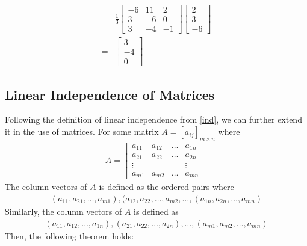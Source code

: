 \documentclass[a4paper]{article}
\theoremstyle{plain}
\theoremstyle{definition}
\newtheorem{exmp}{Example}[section]
\theoremstyle{remark}
\begin{document}
\begin{tcolorbox}[colback=black!3!white,colframe=black!60!white,title=\begin{exmp}Finding inverse using adjoint \label{Finding inverse using adjoint}\end{exmp}]
\begin{align}
			=& \frac{1}{3} \begin{bmatrix} -6 & 11 & 2 \\ 3 & -6 & 0 \\ 3 & -4 & -1 \end{bmatrix} \begin{bmatrix} 2 \\ 3 \\ -6 \end{bmatrix}  \\
			=& \begin{bmatrix} 3 \\ -4 \\ 0 \end{bmatrix} 
		\end{align}
\end{tcolorbox}
\subsection{Linear Independence of Matrices}
Following the definition of linear independence from \ref{ind}, we can further extend it in the use of matrices. For some matrix $A = [a_{ij}]_{m \times n}$ where
\begin{align}
	A = \begin{bmatrix} a_{11} & a_{12} & \ldots & a_{1n}\\
	a_{21} & a_{22} & \ldots & a_{2n}\\ 
\vdots & & & \vdots \\
a_{m1} & a_{m2} & \ldots & a_{mn}\end{bmatrix} 
\end{align}
The column vectors of $A$ is defined as the ordered pairs where
\begin{align}
	(a_{11},a_{21},\ldots,a_{m1}),(a_{12},a_{22},\ldots,a_{m2},\ldots,(a_{1n},a_{2n},\ldots,a_{mn})
\end{align}
Similarly, the column vectors of $A$ is defined as
\begin{align}
	(a_{11},a_{12},\ldots,a_{1n}),(a_{21},a_{22},\ldots,a_{2n}),\ldots,(a_{m1}, a_{m2},\ldots,a_{mn})
\end{align}
Then, the following theorem holds:
\end{document}
